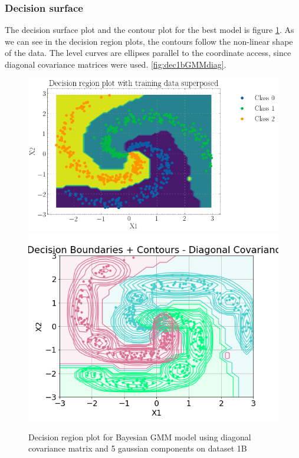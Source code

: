 \documentclass[11pt,a4paper]{article}
\begin{document}
\subsubsection{Decision surface}
The decision surface plot and the contour plot for the best model is figure \ref{fig:dec1bGMMdiag}. As we can see in the decision region plots, the contours follow the non-linear shape of the data. The level curves are ellipses parallel to the coordinate access, since diagonal covariance matrices were used. \autoref{fig:dec1bGMMdiag}.
\begin{figure}[H]
    \centering
    \hspace{4em}\includegraphics[scale=0.5]{images/decisionReg_ds2.png}
    \includegraphics[scale=0.5]{images/contour1b.png}
    \caption{Decision region plot for Bayesian GMM model using diagonal covariance matrix and 5 gaussian components on dataset 1B}
    \label{fig:dec1bGMMdiag}
\end{figure}
\end{document}
